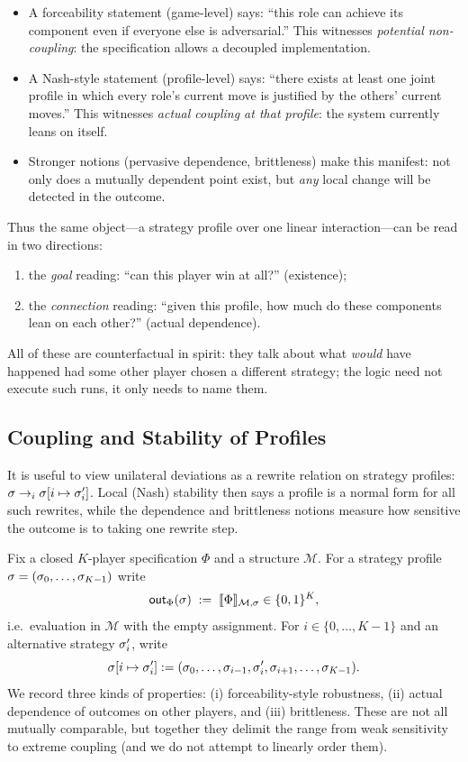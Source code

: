 \begin{itemize}
  \item A forceability statement (game-level) says: ``this role can achieve its
    component even if everyone else is adversarial.'' This witnesses
    \emph{potential non-coupling}: the specification allows a decoupled
    implementation.
  \item A Nash-style statement (profile-level) says: ``there exists at least one
    joint profile in which every role’s current move is justified by the others’
    current moves.'' This witnesses \emph{actual coupling at that profile}: the
    system currently leans on itself.
  \item Stronger notions (pervasive dependence, brittleness) make this
    manifest: not only does a mutually dependent point exist, but \emph{any}
    local change will be detected in the outcome.
\end{itemize}

Thus the same object---a strategy profile over one linear interaction---can be
read in two directions:
\begin{enumerate}[nosep]
  \item the \emph{goal} reading: ``can this player win at all?'' (existence);
  \item the \emph{connection} reading: ``given this profile, how much do these
        components lean on each other?'' (actual dependence).
\end{enumerate}
All of these are counterfactual in spirit: they talk about what \emph{would}
have happened had some other player chosen a different strategy; the logic need
not execute such runs, it only needs to name them.

\subsection{Coupling and Stability of Profiles}
\label{subsec:coupling-stability}
It is useful to view unilateral deviations as a rewrite relation on strategy
profiles: $\sigma \to_i \sigma[i \mapsto \sigma_i']$. Local (Nash) stability
then says a profile is a normal form for all such rewrites, while the
dependence and brittleness notions measure how sensitive the outcome is to
taking one rewrite step.

Fix a closed $K$-player specification $\Phi$ and a structure $\mathcal M$.
For a strategy profile $\sigma = (\sigma_0,\dots,\sigma_{K-1})$ write
\[
  \mathsf{out}_\Phi(\sigma)
  \;:=\;
  \llbracket \Phi \rrbracket_{\mathcal M, \sigma}
  \in \{0,1\}^K,
\]
i.e.\ evaluation in $\mathcal M$ with the empty assignment. For
$i \in \{0,\dots,K-1\}$ and an alternative strategy $\sigma_i'$, write
\[
  \sigma[i \mapsto \sigma_i']
  :=
  (\sigma_0,\dots,\sigma_{i-1},\sigma_i',\sigma_{i+1},\dots,\sigma_{K-1}).
\]
We record three kinds of properties: (i) forceability-style robustness, (ii)
actual dependence of outcomes on other players, and (iii) brittleness. These are
not all mutually comparable, but together they delimit the range from weak
sensitivity to extreme coupling (and we do not attempt to linearly order them).

